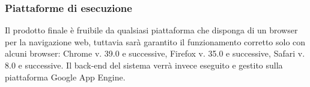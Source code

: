 \subsubsection{Piattaforme di esecuzione}
Il prodotto finale è fruibile da qualsiasi piattaforma che disponga di un browser per la navigazione web, tuttavia sarà garantito il funzionamento corretto solo con alcuni browser: Chrome v. 39.0 e successive, Firefox v. 35.0 e successive, Safari v. 8.0 e successive.
Il back-end del sistema verrà invece eseguito e gestito sulla piattaforma Google App Engine.
